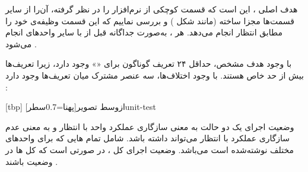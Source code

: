 
هدف اصلی ، این است که قسمت کوچکی از نرم‌افزار را در نظر
گرفته، آن‌را از سایر قسمت‌ها مجزا ساخته (مانند شکل )
و بررسی نماییم که این قسمت وظیفه‌ی خود را مطابق انتظار انجام می‌دهد. هر
، به‌صورت جداگانه قبل از  با سایر
واحدهای  انجام می‌شود .

با وجود هدف مشخص، حداقل ۲۴ تعریف گوناگون برای «» وجود
دارد، زیرا تعریف‌ها بیش از حد خاص هستند. با وجود اختلاف‌ها، سه عنصر
مشترک میان تعریف‌ها وجود دارد :






[tbp]
‌ازوسط
‌تصویر[پهنا=0.7‌سطر]{unit-test}

وضعیت اجرای یک  دو حالت  به معنی سازگاری
عملکرد واحد با انتظار و  به معنی عدم سازگاری عملکرد با
انتظار می‌تواند داشته باشد.  شامل تمام ‌هایی که
برای واحدهای مختلف نوشته‌شده است می‌باشد. وضعیت اجرای کل
، در صورتی  است که کل ‌ها در
وضعیت  باشند .

